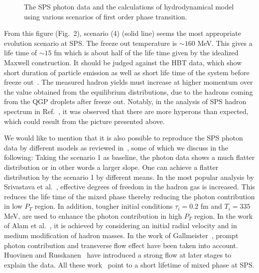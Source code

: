 \begin{figure}[t]
\centerline{}
\caption{The SPS photon data and the calculations of hydrodynamical
model using various scenarios of first order phase transition.}
\end{figure}

  From this figure (Fig.~2), scenario (4) (solid line) seems the 
most appropriate evolution scenario at SPS. 
The freeze out temperature is $\sim 160$ MeV. 
This gives a life time of $\sim 15$ fm which is about half of the
life time given by the idealized Maxwell construction. It should be 
judged against the HBT data, which show short duration of particle 
emission as well as short life time of the system before freeze 
out~\cite{HBT}. The measured hadron yields
must increase at higher momentum over the value obtained from the 
equilibrium distributions, due to the hadrons coming from the 
QGP droplets after freeze out. Notably, in the analysis of SPS hadron 
spectrum in Ref.~\cite{XU}, it was observed that there are more hyperons 
than expected, which could result from the picture presented above.

  We would like to mention that it is also possible to reproduce the SPS
photon data by different models as reviewed in~\cite{PEITTHOMA,GALER},
some of which we discuss in the following:
 Taking the scenario 1 as baseline, the photon data shows a much flatter
distribution or in other words a larger slope. One can achieve a flatter
distribution by the scenario 1 by different means.
 In the most popular analysis by 
Srivastava et al.~\cite{SRIVASTAVA}, effective degrees of freedom in 
the hadron gas is increased. This reduces the life time of the 
mixed phase thereby reducing the photon contribution in low $P_T$ region.
In addition, tougher initial conditions $\tau_i = 0.2$ fm and 
$T_i = 335$ MeV, are used to enhance the
photon contribution in high $P_T$ region. In the work of 
Alam et al.~\cite{ALAM}, it is achieved by considering an initial radial 
velocity and in medium modification of hadron masses. In the work of 
Gallmeister~\cite{GALLMEISTER}, prompt photon contribution and
transverse flow effect have been taken into account. 
Huovinen and Russkanen~\cite{HUOV} have introduced a strong flow at later 
stages to explain the data. All these 
work~\cite{SRIVASTAVA,ALAM,GALLMEISTER,HUOV} point to a short lifetime
of mixed phase at SPS. 
 
